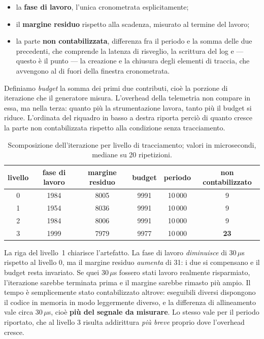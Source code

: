 \documentclass[11pt,a4paper]{article}
\newcommand{\us}{\,$\mu$s}
\begin{document}
\begin{itemize}
\item la \textbf{fase di lavoro}, l'unica cronometrata esplicitamente;
\item il \textbf{margine residuo} rispetto alla scadenza, misurato al termine del lavoro;
\item la parte \textbf{non contabilizzata}, differenza fra il periodo e la somma delle due
precedenti, che comprende la latenza di risveglio, la scrittura del log e --- questo \`e il punto ---
la creazione e la chiusura degli elementi di traccia, che avvengono al di fuori della finestra
cronometrata.
\end{itemize}

Definiamo \emph{budget} la somma dei primi due contributi, cio\`e la porzione di iterazione che il
generatore misura. L'overhead della telemetria non compare in essa, ma nella terza: quanto pi\`u la
strumentazione lavora, tanto pi\`u il budget si riduce. L'ordinata del riquadro in basso a destra
riporta perci\`o di quanto cresce la parte non contabilizzata rispetto alla condizione senza
tracciamento.

\begin{table}[h]\centering\small
\begin{tabular}{cccccc}
\toprule
\textbf{livello} & fase di lavoro & margine residuo & \textbf{budget} & periodo & non contabilizzato \\
\midrule
0 & 1984 & 8005 & 9991 & 10\,000 & 9 \\
1 & 1954 & 8036 & 9991 & 10\,000 & 9 \\
2 & 1984 & 8006 & 9991 & 10\,000 & 9 \\
3 & 1999 & 7979 & 9977 & 10\,000 & \textbf{23} \\
\bottomrule
\end{tabular}
\caption{Scomposizione dell'iterazione per livello di tracciamento; valori in microsecondi,
mediane su 20 ripetizioni.}
\label{tab:anatomia}
\end{table}

La riga del livello~1 chiarisce l'artefatto. La fase di lavoro \emph{diminuisce} di 30\us{} rispetto
al livello 0, ma il margine residuo \emph{aumenta} di 31: i due si compensano e il budget resta
invariato. Se quei 30\us{} fossero stati lavoro realmente risparmiato, l'iterazione sarebbe
terminata prima e il margine sarebbe rimasto pi\`u ampio. Il tempo \`e semplicemente stato
contabilizzato altrove: eseguibili diversi dispongono il codice in memoria in modo leggermente
diverso, e la differenza di allineamento vale circa 30\us, cio\`e \textbf{pi\`u del segnale da
misurare}. Lo stesso vale per il periodo riportato, che al livello 3 risulta addirittura
\emph{pi\`u breve} proprio dove l'overhead cresce.
\end{document}
